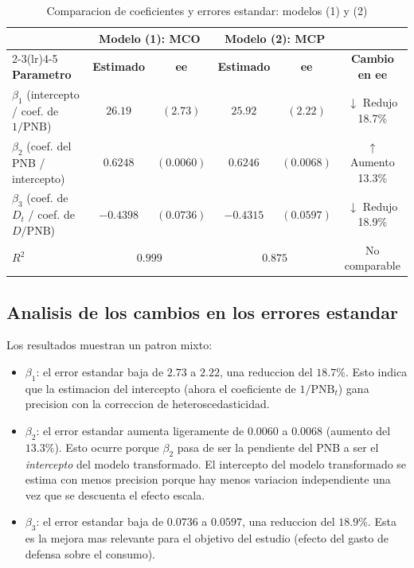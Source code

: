 \documentclass[12pt, letterpaper]{article}
\theoremstyle{remark}
\begin{document}
\begin{table}[ht]
\centering
\caption{Comparacion de coeficientes y errores estandar: modelos (1) y (2)}
\label{tab:comparacion}
\small
\begin{tabular}{lccccc}
\toprule
& \multicolumn{2}{c}{\textbf{Modelo (1): MCO}}
& \multicolumn{2}{c}{\textbf{Modelo (2): MCP}}
& \\
\cmidrule(lr){2-3}\cmidrule(lr){4-5}
\textbf{Parametro}
  & \textbf{Estimado}
  & \textbf{ee}
  & \textbf{Estimado}
  & \textbf{ee}
  & \textbf{Cambio en ee} \\
\midrule
$\beta_1$ (intercepto / coef. de $1/\text{PNB}$)
  & $26.19$ & $(2.73)$
  & $25.92$ & $(2.22)$
  & $\downarrow$ Redujo 18.7\% \\[4pt]
$\beta_2$ (coef. del PNB / intercepto)
  & $0.6248$ & $(0.0060)$
  & $0.6246$ & $(0.0068)$
  & $\uparrow$ Aumento 13.3\% \\[4pt]
$\beta_3$ (coef. de $D_t$ / coef. de $D/\text{PNB}$)
  & $-0.4398$ & $(0.0736)$
  & $-0.4315$ & $(0.0597)$
  & $\downarrow$ Redujo 18.9\% \\
\midrule
$R^2$ & \multicolumn{2}{c}{$0.999$} & \multicolumn{2}{c}{$0.875$} & No comparable \\
\bottomrule
\end{tabular}
\end{table}

\subsection{Analisis de los cambios en los errores estandar}

Los resultados muestran un patron mixto:

\begin{itemize}[leftmargin=1.6em, itemsep=5pt]
  \item \textbf{$\beta_1$}: el error estandar baja de $2.73$ a $2.22$, una
    reduccion del $18.7\%$. Esto indica que la estimacion del intercepto
    (ahora el coeficiente de $1/\text{PNB}_t$) gana precision con la
    correccion de heteroscedasticidad.

  \item \textbf{$\beta_2$}: el error estandar aumenta ligeramente de $0.0060$
    a $0.0068$ (aumento del $13.3\%$). Esto ocurre porque $\beta_2$ pasa de
    ser la pendiente del PNB a ser el \emph{intercepto} del modelo transformado.
    El intercepto del modelo transformado se estima con menos precision porque
    hay menos variacion independiente una vez que se descuenta el efecto escala.

  \item \textbf{$\beta_3$}: el error estandar baja de $0.0736$ a $0.0597$,
    una reduccion del $18.9\%$. Esta es la mejora mas relevante para el objetivo
    del estudio (efecto del gasto de defensa sobre el consumo).
\end{itemize}
\end{document}
